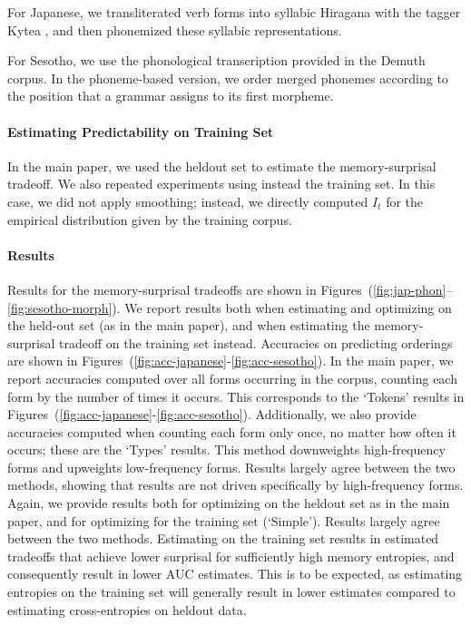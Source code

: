 \documentclass[11pt,letterpaper]{article}
\begin{document}
For Japanese, we transliterated verb forms into syllabic Hiragana with the tagger Kytea \citep{DBLP:conf/lrec/NeubigM10,DBLP:conf/acl/NeubigNM11}, and then phonemized these syllabic representations.


For Sesotho, we use the phonological transcription provided in the Demuth corpus.
In the phoneme-based version, we order merged phonemes according to the position that a grammar assigns to its first morpheme.

\paragraph{Estimating Predictability on Training Set}
In the main paper, we used the heldout set to estimate the memory-surprisal tradeoff.
We also repeated experiments using instead the training set.
In this case, we did not apply smoothing; instead, we directly computed $I_t$ for the empirical distribution given by the training corpus.

\paragraph{Results}
Results for the memory-surprisal tradeoffs are shown in Figures~(\ref{fig:jap-phon}--\ref{fig:sesotho-morph}).
We report results both when estimating and optimizing on the held-out set (as in the main paper), and when estimating the memory-surprisal tradeoff on the training set instead.
Accuracies on predicting orderings are shown in Figures~(\ref{fig:acc-japanese}-\ref{fig:acc-sesotho}).
In the main paper, we report accuracies computed over all forms occurring in the corpus, counting each form by the number of times it occurs. This corresponds to the `Tokens' results in Figures~(\ref{fig:acc-japanese}-\ref{fig:acc-sesotho}).
Additionally, we also provide accuracies computed when counting each form only once, no matter how often it occurs; these are the `Types' results. This method downweights high-frequency forms and upweights low-frequency forms.
Results largely agree between the two methods, showing that results are not driven specifically by high-frequency forms.
Again, we provide results both for optimizing on the heldout set as in the main paper, and for optimizing for the training set (`Simple').
Results largely agree between the two methods.
Estimating on the training set results in estimated tradeoffs that achieve lower surprisal for sufficiently high memory entropies, and consequently result in lower AUC estimates. This is to be expected, as estimating entropies on the training set will generally result in  lower estimates compared to estimating cross-entropies on heldout data.
\end{document}
